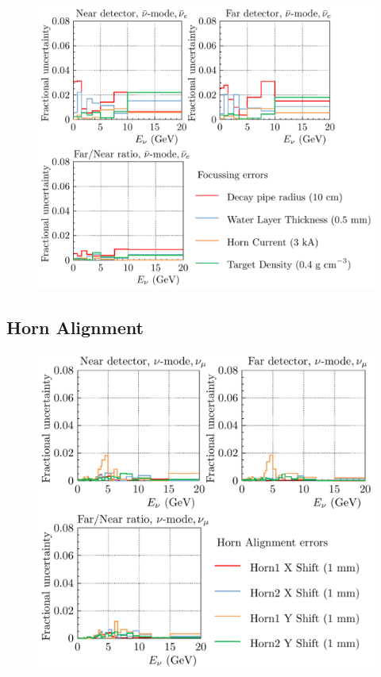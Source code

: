 \documentclass{article}
\begin{document}
\begin{figure}
  \includegraphics[width=\textwidth]{plots/fracerrs/nubarmode_nuebar_Focussing}
  \caption{}
  \label{fig:foc_nubar_nuebar}
\end{figure}

\subsection{Horn Alignment}


\begin{figure}
  \includegraphics[width=\textwidth]{plots/fracerrs/numode_numu_HornAlignment}
  \caption{}
  \label{fig:hornalign_nu_numu}
\end{figure}
\end{document}
